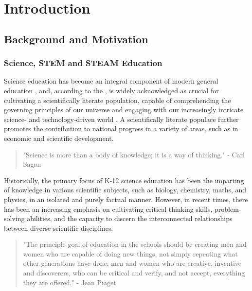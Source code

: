 \cleardoublepage%
\chapter{\label{chap:intro}Introduction}%

\section{\label{sec:intro_background_motivation}Background and Motivation}%

\subsection{\label{sec:intro_se}Science, STEM and STEAM Education}%
Science education has become an integral component of modern general education \citep{atkin_inside_2003}, and, according to the \citet{national_research_council_national_1995, national_research_foundation_science_2022}, is widely acknowledged as crucial for cultivating a scientifically literate population, capable of comprehending the governing principles of our universe and engaging with our increasingly intricate science- and technology-driven world \citep{bybee_case_2013}. A scientifically literate populace further promotes the contribution to national progress in a variety of areas, such as in economic and scientific development. \citep{atkin_inside_2003}

\begin{quote}
    "Science is more than a body of knowledge; it is a way of thinking." - Carl Sagan \citep{sagan_demon-haunted_1995} 
\end{quote}

Historically, the primary focus of K-12 science education has been the imparting of knowledge in various scientific subjects, such as biology, chemistry, maths, and physics, in an isolated and purely factual manner. However, in recent times, there has been an increasing emphasis on cultivating critical thinking skills, problem-solving abilities, and the capacity to discern the interconnected relationships between diverse scientific disciplines. \citep{national_research_council_national_1995, noauthor_next_2013, atkin_inside_2003} 

\begin{quote}
    "The principle goal of education in the schools should be creating men and women who are capable of doing new things, not simply repeating what other generations have done; men and women who are creative, inventive and discoverers, who can be critical and verify, and not accept, everything they are offered." - Jean Piaget \citep{duckworth_piaget_1964}
\end{quote}

